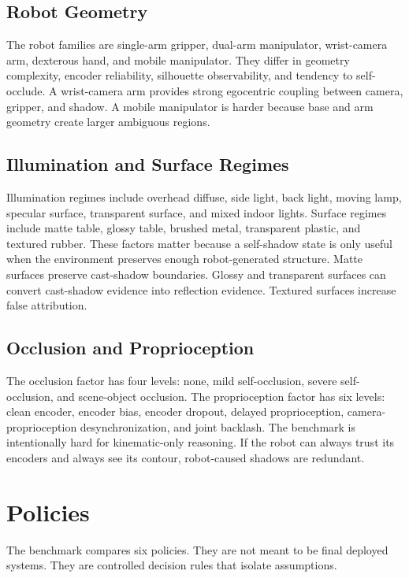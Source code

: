 \documentclass{article}
\begin{document}
\subsection{Robot Geometry}

The robot families are single-arm gripper, dual-arm manipulator, wrist-camera arm, dexterous hand, and mobile manipulator. They differ in geometry complexity, encoder reliability, silhouette observability, and tendency to self-occlude. A wrist-camera arm provides strong egocentric coupling between camera, gripper, and shadow. A mobile manipulator is harder because base and arm geometry create larger ambiguous regions.

\subsection{Illumination and Surface Regimes}

Illumination regimes include overhead diffuse, side light, back light, moving lamp, specular surface, transparent surface, and mixed indoor lights. Surface regimes include matte table, glossy table, brushed metal, transparent plastic, and textured rubber. These factors matter because a self-shadow state is only useful when the environment preserves enough robot-generated structure. Matte surfaces preserve cast-shadow boundaries. Glossy and transparent surfaces can convert cast-shadow evidence into reflection evidence. Textured surfaces increase false attribution.

\subsection{Occlusion and Proprioception}

The occlusion factor has four levels: none, mild self-occlusion, severe self-occlusion, and scene-object occlusion. The proprioception factor has six levels: clean encoder, encoder bias, encoder dropout, delayed proprioception, camera-proprioception desynchronization, and joint backlash. The benchmark is intentionally hard for kinematic-only reasoning. If the robot can always trust its encoders and always see its contour, robot-caused shadows are redundant.

\section{Policies}

The benchmark compares six policies. They are not meant to be final deployed systems. They are controlled decision rules that isolate assumptions.
\end{document}
